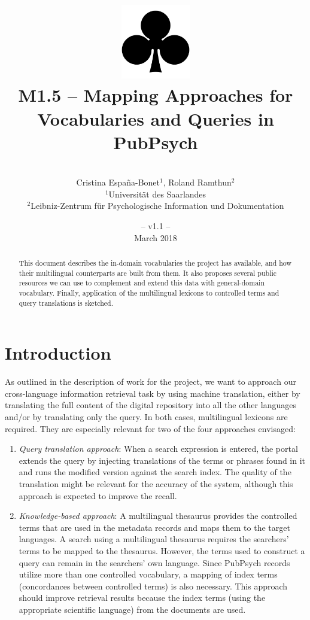 \documentclass[a4paper,11pt]{article}
\title{
\includegraphics[width=3cm]{./img/200px-SuitClubs.png} \\
\Huge M1.5 -- Mapping Approaches for \\ Vocabularies and Queries in PubPsych }
\author{\vspace*{1cm}\\ \LARGE Cristina Espa\~na-Bonet$^{1}$, Roland Ramthun$^{2}$ \medskip \\ 
	\Large $^{1}$Universit\"at des Saarlandes\\ \Large $^{2}$Leibniz-Zentrum für Psychologische Information und Dokumentation}
\date{\vspace*{2cm} -- v1.1 --\\March 2018}
\begin{document}
\clearpage\maketitle
\thispagestyle{empty}\thispagestyle{empty}

\vspace*{5cm}
\begin{abstract}
This document describes the in-domain vocabularies the project has available, and how their multilingual counterparts are built from them. It also proposes several public resources we can use to complement and extend this data with general-domain vocabulary. Finally, application of the multilingual lexicons to controlled terms and query translations is sketched. 
\end{abstract}

\newpage
\tableofcontents
\clearpage


\section{Introduction}
\label{s:intro}

As outlined in the description of work for the project, we want to approach our cross-language information retrieval task by using machine translation, either by translating the full content of the digital repository into all the other languages and/or by translating only the query. In both cases, multilingual lexicons are required. They are especially relevant for two of the four approaches envisaged:

\begin{enumerate}
 \item \emph{Query translation approach}: When a search expression is entered, the portal extends the query by injecting translations of the terms or phrases found in it and runs the modified version against the search index. The quality of the translation might be relevant for the accuracy of the system, although this approach is expected to improve the recall.

 \item \emph{Knowledge-based approach}: A multilingual thesaurus provides the controlled terms that are used in the metadata records and maps them to the target languages. A search using a multilingual thesaurus requires the searchers' terms to be mapped to the thesaurus. However, the terms used to construct a query can remain in the searchers' own language. Since PubPsych records utilize more than one controlled vocabulary, a mapping of index terms (concordances between controlled terms) is also necessary. This approach should improve retrieval results because the index terms (using the appropriate scientific language) from the documents are used. 
\end{enumerate}
\end{document}
